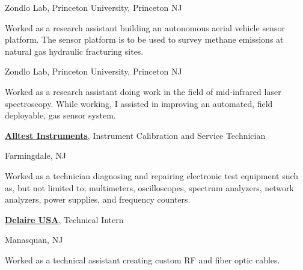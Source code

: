 \documentclass[letterpaper,10pt,oneside]{article}
\newcommand{\CVNote}{CV compiled on {\today} for Acme Corporation}
\begin{document}
\begin{body}
\GapNoBreak
\BulletItem
Zondlo Lab, Princeton University, Princeton NJ
\hfill
{}
\begin{detail}
\SubBulletItem
Worked as a research assistant building an autonomous aerial vehicle sensor platform. The sensor platform is to be used to survey methane emissions at natural gas hydraulic fracturing sites.
\end{detail}

\BulletItem
Zondlo Lab, Princeton University, Princeton NJ
\hfill
{}
\begin{detail}
\SubBulletItem
Worked as a research assistant doing work in the field of mid-infrared laser spectroscopy. While working, I assisted in improving an automated, field deployable, gas sensor system.
\end{detail}

\vspace{5mm}

\href{http://www.alltest.net/}
{\textbf{Alltest Instruments}},
Instrument Calibration and Service Technician

\GapNoBreak
\BulletItem
Farmingdale, NJ
\hfill
{}
\begin{detail}
\SubBulletItem
Worked as a technician diagnosing and repairing electronic test equipment such as, but not limited to; multimeters, oscilloscopes, spectrum analyzers, network analyzers, power supplies, and frequency counters.

\end{detail}

\vspace{5mm}

\href{http://www.alltest.net/}
{\textbf{Delaire USA}},
Technical Intern

\GapNoBreak
\BulletItem
Manasquan, NJ
\hfill
{}
\begin{detail}
\SubBulletItem
Worked as a technical assistant creating custom RF and fiber optic cables.
\end{detail}
\end{body}



\label{LastPage}~
\end{document}
